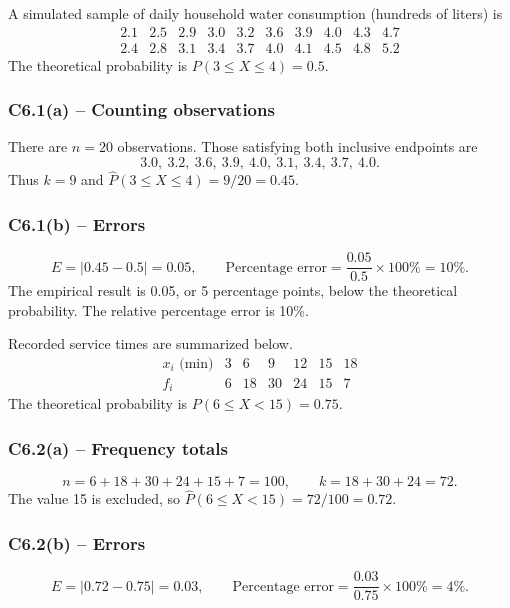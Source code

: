 {
A simulated sample of daily household water consumption (hundreds of liters) is
\[
\begin{array}{cccccccccc}
2.1&2.5&2.9&3.0&3.2&3.6&3.9&4.0&4.3&4.7\\
2.4&2.8&3.1&3.4&3.7&4.0&4.1&4.5&4.8&5.2
\end{array}
\]
The theoretical probability is $P(3\le X\le4)=0.5$.
\label{sol:c6-1a}
\subsubsection*{C6.1(a) -- Counting observations }
There are $n=20$ observations. Those satisfying both inclusive endpoints are
\[
3.0,\ 3.2,\ 3.6,\ 3.9,\ 4.0,\ 3.1,\ 3.4,\ 3.7,\ 4.0.
\]
Thus $k=9$ and $\widehat P(3\le X\le4)=9/20=0.45$.
\label{sol:c6-1b}
\subsubsection*{C6.1(b) -- Errors }
\[
E=|0.45-0.5|=0.05,\qquad
\text{Percentage error}=\frac{0.05}{0.5}\times100\%=10\%.
\]
The empirical result is 0.05, or 5 percentage points, below the theoretical
probability. The relative percentage error is 10\%.
\secInicio[sec:c6-1]
}

{
Recorded service times are summarized below.
\[
\begin{array}{c|rrrrrr}
 x_i\text{ (min)}&3&6&9&12&15&18\\\hline
 f_i&6&18&30&24&15&7
\end{array}
\]
The theoretical probability is $P(6\le X<15)=0.75$.
\label{sol:c6-2a}
\subsubsection*{C6.2(a) -- Frequency totals }
\[
n=6+18+30+24+15+7=100,\qquad k=18+30+24=72.
\]
The value 15 is excluded, so $\widehat P(6\le X<15)=72/100=0.72$.
\label{sol:c6-2b}
\subsubsection*{C6.2(b) -- Errors }
\[
E=|0.72-0.75|=0.03,\qquad
\text{Percentage error}=\frac{0.03}{0.75}\times100\%=4\%.
\]
\secInicio[sec:c6-2]
}

